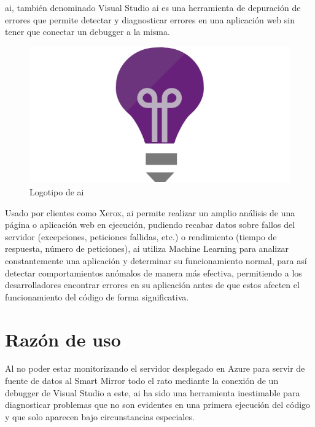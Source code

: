 \acrfull{ai}\cite{AI}, también denominado Visual Studio \acrfull{ai} es una herramienta de depuración de errores que permite detectar y diagnosticar errores en una aplicación web sin tener que conectar un debugger a la misma.

\begin{figure}[!htbp]
	\centering
	\includegraphics[scale=0.50]{fig/applicationinsights_logo}
	\caption{Logotipo de \acrfull{ai}}
\end{figure}

Usado por clientes como Xerox\cite{Xerox}, \acrshort{ai} permite realizar un amplio análisis de una página o aplicación web en ejecución, pudiendo recabar datos sobre fallos del servidor (excepciones, peticiones fallidas, etc.) o rendimiento (tiempo de respuesta, número de peticiones), \acrshort{ai} utiliza Machine Learning para analizar constantemente una aplicación y determinar su funcionamiento normal, para así detectar comportamientos anómalos de manera más efectiva, permitiendo a los desarrolladores encontrar errores en su aplicación antes de que estos afecten el funcionamiento del código de forma significativa.

\section{Razón de uso}

Al no poder estar monitorizando el servidor desplegado en Azure para servir de fuente de datos al Smart Mirror todo el rato mediante la conexión de un debugger de Visual Studio a este, \acrshort{ai} ha sido una herramienta inestimable para diagnosticar problemas que no son evidentes en una primera ejecución del código y que solo aparecen bajo circunstancias especiales.

